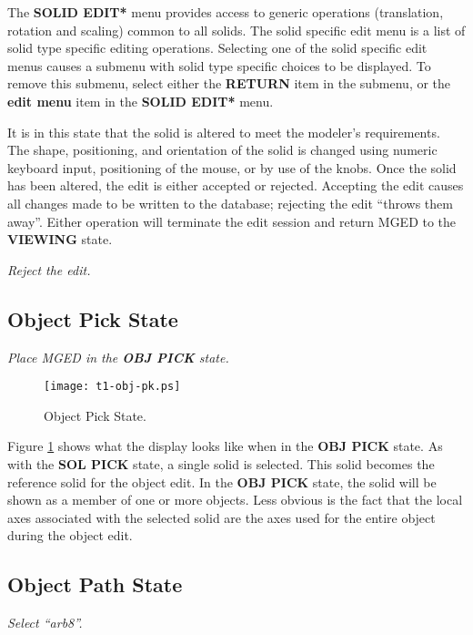The {\bf *SOLID EDIT*} menu provides access to generic operations (translation, rotation
and scaling) common to all solids.
The solid specific edit menu is a list of solid type specific editing operations.
Selecting one of the solid specific edit menus causes a submenu with solid type specific
choices to be displayed.  To remove this submenu, select either the
{\bf RETURN} item in the submenu, or the {\bf edit menu} item in the
{\bf *SOLID EDIT*} menu.

It is in this state that the solid is altered to meet the modeler's
requirements. The shape, positioning, and orientation of the solid is
changed using numeric keyboard input, positioning of the mouse, or by
use of the knobs.  Once the solid has been altered, the edit is
either accepted or rejected.  Accepting the edit causes all changes
made to be written to the database; rejecting the edit ``throws them
away''. Either operation will terminate the edit session and return MGED
to the {\bf VIEWING} state.

\noindent
{\em Reject the edit.}\\

\subsection{Object Pick State}

\noindent
{\em Place MGED in the {\bf OBJ PICK} state.}\\

\begin{figure}
\centering \texttt{[image: t1-obj-pk.ps]}
\caption{Object Pick State.}
\label{t1-obj-pk}
\end{figure}

Figure \ref{t1-obj-pk} shows what the display looks like when in the
{\bf OBJ PICK} state. As with the {\bf SOL PICK} state, a single solid is
selected.  This solid becomes the reference solid for the object edit.
In the {\bf OBJ PICK} state, the solid will be shown
as a member of one or more objects.  Less obvious is the fact that the
local axes associated with the selected solid are the axes used for the
entire object during the object edit.

\subsection{Object Path State}

\noindent
{\em Select ``arb8''.}\\

